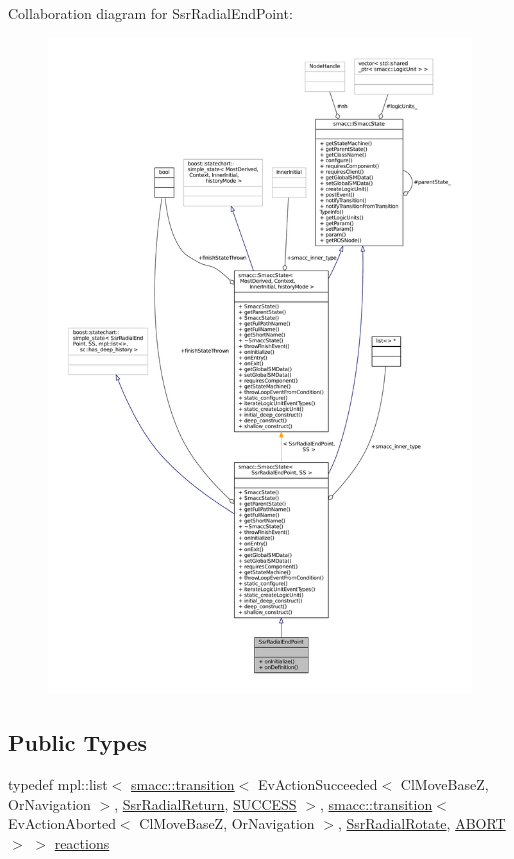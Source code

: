 Collaboration diagram for Ssr\+Radial\+End\+Point\+:
\nopagebreak
\begin{figure}[H]
\begin{center}
\leavevmode
\includegraphics[width=350pt]{structSsrRadialEndPoint__coll__graph}
\end{center}
\end{figure}
\subsection*{Public Types}
\begin{DoxyCompactItemize}
\item 
typedef mpl\+::list$<$ \hyperlink{classsmacc_1_1transition}{smacc\+::transition}$<$ Ev\+Action\+Succeeded$<$ Cl\+Move\+BaseZ, Or\+Navigation $>$, \hyperlink{structSsrRadialReturn}{Ssr\+Radial\+Return}, \hyperlink{classSUCCESS}{S\+U\+C\+C\+E\+SS} $>$, \hyperlink{classsmacc_1_1transition}{smacc\+::transition}$<$ Ev\+Action\+Aborted$<$ Cl\+Move\+BaseZ, Or\+Navigation $>$, \hyperlink{structSsrRadialRotate}{Ssr\+Radial\+Rotate}, \hyperlink{classABORT}{A\+B\+O\+RT} $>$ $>$ \hyperlink{structSsrRadialEndPoint_ae7b83b9a03aa9f567f7ce318ef856bf1}{reactions}
\end{DoxyCompactItemize}
